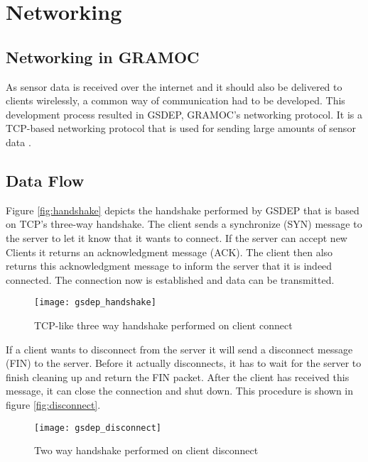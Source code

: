\chapter{Networking}
\label{ch:networking}

\author{Nico Kratky}
%
\section{Networking in GRAMOC}

As sensor data is received over the internet and it should also be delivered to clients wirelessly, a common way of communication had to be developed. This development process resulted in GSDEP, GRAMOC's networking protocol. It is a TCP-based networking protocol that is used for sending large amounts of sensor data \autocite{rfc793}.

\section{Data Flow}
\label{sec:networking_data-flow}

Figure \vref{fig:handshake} depicts the handshake performed by GSDEP that is based on TCP's three-way handshake. The client sends a synchronize (SYN) message to the server to let it know that it wants to connect. If the server can accept new Clients it returns an acknowledgment message (ACK). The client then also returns this acknowledgment message to inform the server that it is indeed connected. The connection now is established and data can be transmitted.

\begin{figure}[h]
    \centering
    \texttt{[image: gsdep\_handshake]}
    \caption{TCP-like three way handshake performed on client connect}
    \label{fig:handshake}
\end{figure}

If a client wants to disconnect from the server it will send a disconnect message (FIN) to the server. Before it actually disconnects, it has to wait for the server to finish cleaning up and return the FIN packet. After the client has received this message, it can close the connection and shut down. This procedure is shown in figure \vref{fig:disconnect}.

\begin{figure}[h]
    \centering
    \texttt{[image: gsdep\_disconnect]}
    \caption{Two way handshake performed on client disconnect}
    \label{fig:disconnect}
\end{figure}

